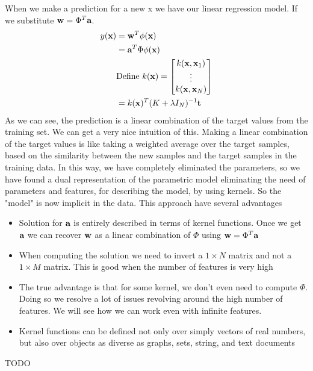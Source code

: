 \documentclass[main.tex]{subfiles}
\begin{document}
When we make a prediction for a new x we have our linear regression model. If we substitute $\textbf{w}=\Phi^T \textbf{a}$.
\begin{align*}
    y(\textbf{x}) &= \textbf{w}^T\phi(\textbf{x}) \\
    &= \textbf{a}^T\Phi \phi(\textbf{x}) \\
    &\text{Define }k(\textbf{x})=
    \begin{bmatrix}
    k(\textbf{x},\textbf{x}_1) \\
    \vdots \\
    k(\textbf{x},\textbf{x}_N)
    \end{bmatrix} \\
    &= k(\textbf{x})^T (K + \lambda I_N)^{-1} \textbf{t}
\end{align*}
As we can see, the prediction is a linear combination of the target values from the training set. We can get a very nice intuition of this. Making a linear combination of the target values is like taking a weighted average over the target samples, based on the similarity between the new samples and the target samples in the training data. In this way, we have completely eliminated the parameters, so we have found a dual representation of the parametric model eliminating the need of parameters and features, for describing the model, by using kernels. So the "model" is now implicit in the data.
This approach have several advantages
\begin{itemize}
    \item Solution for $\textbf{a}$ is entirely described in terms of kernel functions. Once we get $\textbf{a}$ we can recover $\textbf{w}$ as a linear combination of $\Phi$ using $\textbf{w} = \Phi^T \textbf{a}$
    \item When computing the solution we need to invert a $1 \times N$ matrix and not a $1 \times M$ matrix. This is good when the number of features is very high
    \item The true advantage is that for some kernel, we don't even need to compute $\Phi$. Doing so we resolve a lot of issues revolving around the high number of features. We will see how we can work even with infinite features.
    \item Kernel functions can be defined not only over simply vectors of real numbers, but also over objects as diverse as graphs, sets, string, and text documents
\end{itemize}

{\huge{TODO}}
\end{document}
